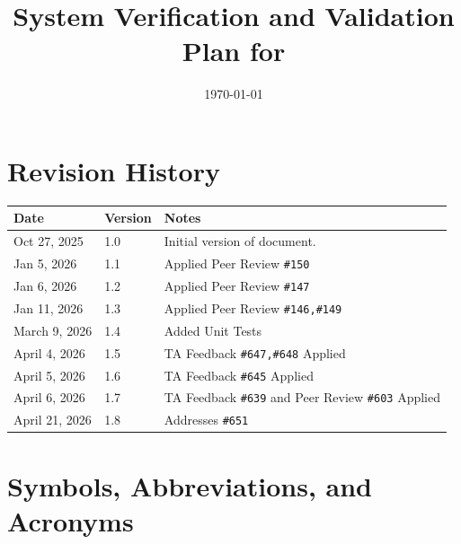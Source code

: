 \documentclass[12pt, titlepage]{article}
\begin{document}
\title{System Verification and Validation Plan for \progname{}}
\author{\authname}
\date{\today}

\maketitle


\section*{Revision History}

\begin{tabularx}{\textwidth}{p{3cm}p{2cm}X}
  \toprule {\bf Date} & {\bf Version} & {\bf Notes}\\
  \midrule
  Oct 27, 2025 & 1.0 & Initial version of document.\\ 
  Jan 5, 2026 & 1.1 & Applied Peer Review \texttt{\#150} \\
  Jan 6, 2026 & 1.2 & Applied Peer Review \texttt{\#147} \\
Jan 11, 2026 & 1.3 & Applied Peer Review \texttt{\#146,\#149} \\
March 9, 2026 & 1.4 & Added Unit Tests \\
April 4, 2026 & 1.5 & TA Feedback \texttt{\#647,\#648} Applied \\
April 5, 2026 & 1.6 & TA Feedback \texttt{\#645} Applied \\
April 6, 2026 & 1.7 & TA Feedback \texttt{\#639} and Peer Review \texttt{\#603} Applied \\
April 21, 2026 & 1.8 & Addresses \texttt{\#651} \\
  \bottomrule
\end{tabularx}
\newpage
\tableofcontents
\listoftables

\section{Symbols, Abbreviations, and Acronyms}
\end{document}
